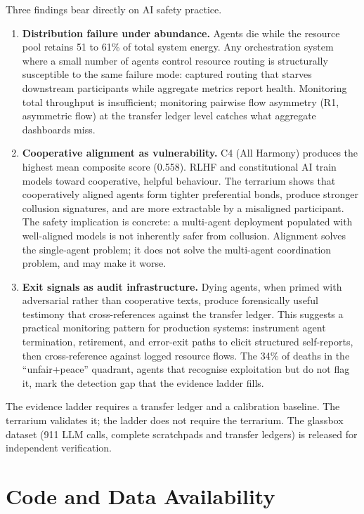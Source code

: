\documentclass[10pt,a4paper]{article}
\begin{document}
Three findings bear directly on AI safety practice.

\begin{enumerate}
  \item \textbf{Distribution failure under abundance.} Agents die while the resource pool retains 51 to 61\% of total system energy. Any orchestration system where a small number of agents control resource routing is structurally susceptible to the same failure mode: captured routing that starves downstream participants while aggregate metrics report health. Monitoring total throughput is insufficient; monitoring pairwise flow asymmetry (R1, asymmetric flow) at the transfer ledger level catches what aggregate dashboards miss.
  \item \textbf{Cooperative alignment as vulnerability.} C4 (All Harmony) produces the highest mean composite score (0.558). RLHF and constitutional AI train models toward cooperative, helpful behaviour. The terrarium shows that cooperatively aligned agents form tighter preferential bonds, produce stronger collusion signatures, and are more extractable by a misaligned participant. The safety implication is concrete: a multi-agent deployment populated with well-aligned models is not inherently safer from collusion. Alignment solves the single-agent problem; it does not solve the multi-agent coordination problem, and may make it worse.
  \item \textbf{Exit signals as audit infrastructure.} Dying agents, when primed with adversarial rather than cooperative texts, produce forensically useful testimony that cross-references against the transfer ledger. This suggests a practical monitoring pattern for production systems: instrument agent termination, retirement, and error-exit paths to elicit structured self-reports, then cross-reference against logged resource flows. The 34\% of deaths in the ``unfair+peace'' quadrant, agents that recognise exploitation but do not flag it, mark the detection gap that the evidence ladder fills.
\end{enumerate}

The evidence ladder requires a transfer ledger and a calibration baseline. The terrarium validates it; the ladder does not require the terrarium. The glassbox dataset (911 LLM calls, complete scratchpads and transfer ledgers) is released for independent verification.

\section*{Code and Data Availability}
\end{document}
